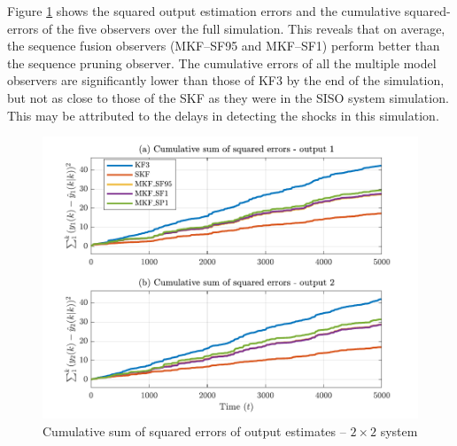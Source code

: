 Figure \ref{fig:sim-sys-sim2-MKF-cumerr} shows the squared output estimation errors and the cumulative squared-errors of the five observers over the full simulation. This reveals that on average, the sequence fusion observers (MKF--SF95 and MKF--SF1) perform better than the sequence pruning observer. The cumulative errors of all the multiple model observers are significantly lower than those of KF3 by the end of the simulation, but not as close to those of the SKF as they were in the SISO system simulation. This may be attributed to the delays in detecting the shocks in this simulation.
\begin{figure}[htp]
	\centering
	\includegraphics[width=13cm]{images/rod_obs_sim3_all_seed_cum_err_y2.pdf}
	\caption{Cumulative sum of squared errors of output estimates –  $2\times2$ system}
	\label{fig:sim-sys-sim2-MKF-cumerr}
\end{figure}

